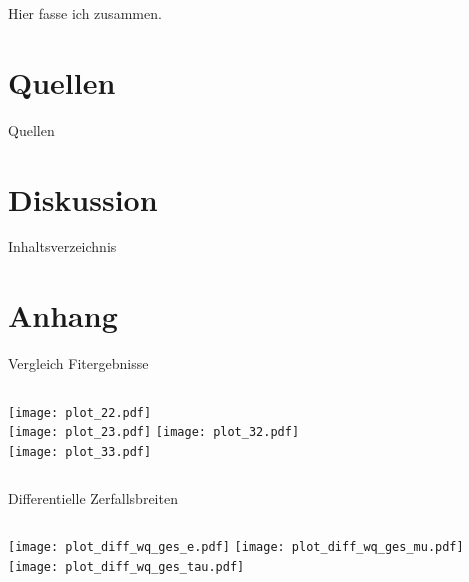 \documentclass[fleqn, aspectratio=1610, professionalfonts, 9pt]{beamer}
\begin{document}
\begin{frame}
    Hier fasse ich zusammen.
\end{frame}

\section{Quellen}

\begin{frame}{Quellen}
  \tableofcontents[currentsection,currentsubsection,
      hideothersubsections,
      sectionstyle=show/shaded,
  ]\end{frame}

\begin{frame}
    \printbibliography
\end{frame}

\section{Diskussion}

\begin{frame}{Inhaltsverzeichnis}
  \tableofcontents[currentsection,currentsubsection,
      hideothersubsections,
      sectionstyle=show/shaded,
  ]\end{frame}


\appendix
\section{Anhang}


\begin{frame}{Vergleich Fitergebnisse}
  \begin{columns}[t]
    \centering
    \texttt{[image: plot\_22.pdf]}\\
    \texttt{[image: plot\_23.pdf]}
    \centering
    \texttt{[image: plot\_32.pdf]}\\
    \texttt{[image: plot\_33.pdf]}
  \end{columns}
\end{frame}

\begin{frame}{Differentielle Zerfallsbreiten}
  \begin{columns}[t]
    \column{\textwidth}
    \centering
    \texttt{[image: plot\_diff\_wq\_ges\_e.pdf]}
    \texttt{[image: plot\_diff\_wq\_ges\_mu.pdf]}
    \texttt{[image: plot\_diff\_wq\_ges\_tau.pdf]}
  \end{columns}
\end{frame}
\end{document}
